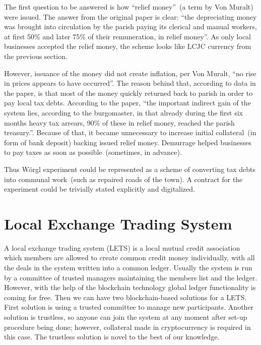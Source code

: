 \documentclass[]{llncs}   %
\begin{document}
 The first question to be answered is how ``relief money''~(a term by Von Muralt) were issued. The answer from the original paper is clear: ``the depreciating money was brought into circulation by the parish paying its clerical and manual workers, at first 50\% and later 75\% of their remuneration, in relief money''. As only local businesses accepted the relief money, the scheme looks like LCJC 
 currency from the previous section. 

 However, issuance of the money did not create inflation, per Von Muralt, ``no rise in prices appears to have occurred''. The reason behind that, according to data in the paper, is that most of the money quickly returned back to parish in order to pay local tax debts. According to the paper, ``the important indirect gain of the system lies, according to the burgomaster, in that already during the first six months heavy tax arrears, 90\% of these in relief money, reached the parish treasury.''. Because of that, it became unnecessary to increase initial collateral~(in form of bank deposit) backing issued relief money. Demurrage helped businesses to pay taxes as soon as possible~(sometimes, in advance). 

 Thus W\"{o}rgl experiment could be represented as a scheme of converting tax debts into communal work~(such as repaired roads of the town). A contract for the experiment could be trivially stated explicitly and digitalized.

\section{Local Exchange Trading System}
\label{sec-lets}

A local exchange trading system (LETS)\cite{williams1996local} is a local mutual credit association which members are allowed to create common credit money individually, with all the deals in the system written into a common ledger. Usually the system is run by a committee of 
trusted managers maintaining the members list and the ledger. However, with the help of the blockchain technology global ledger functionality is coming for free. Then 
we can have two blockchain-based solutions for a LETS. First solution is using a trusted committee to manage new participants. Another 
solution is trustless, so anyone can join the system at any moment after set-up procedure being done; however, collateral made in cryptocurrency is required in this case. The trustless solution is novel to the best of our knowledge.
\end{document}
